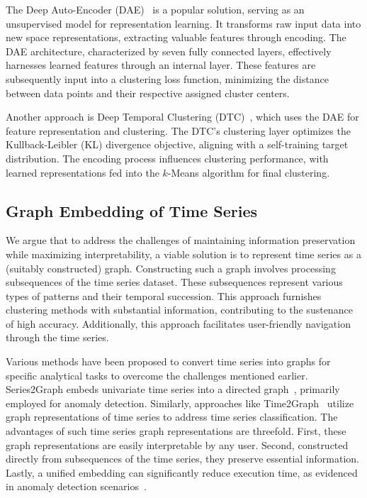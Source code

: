 The Deep Auto-Encoder (DAE)~\cite{tian2014learning} is a popular solution, serving as an unsupervised model for representation learning. It transforms raw input data into new space representations, extracting valuable features through encoding. The DAE architecture, characterized by seven fully connected layers, effectively harnesses learned features through an internal layer. These features are subsequently input into a clustering loss function, minimizing the distance between data points and their respective assigned cluster centers.

Another approach is Deep Temporal Clustering (DTC)~\cite{DTCAlgorithm}, which uses the DAE for feature representation and clustering. The DTC's clustering layer optimizes the Kullback-Leibler (KL) divergence objective, aligning with a self-training target distribution. The encoding process influences clustering performance, with learned representations fed into the $k$-Means algorithm for final clustering.



\subsection{Graph Embedding of Time Series}
\label{sec:graphforts}


We argue that to address the challenges of maintaining information preservation while maximizing interpretability, a viable solution is to represent time series as a (suitably constructed) graph. 
Constructing such a graph involves processing subsequences of the time series dataset. 
These subsequences represent various types of patterns and their temporal succession. This approach furnishes clustering methods with substantial information, contributing to the sustenance of high accuracy. Additionally, this approach facilitates user-friendly navigation through the time series.

Various methods have been proposed to convert time series into graphs for specific analytical tasks to overcome the challenges mentioned earlier. 
Series2Graph embeds univariate time series into a directed graph~\cite{Series2GraphPaper, DistributedS2G}, primarily employed for anomaly detection. Similarly, approaches like Time2Graph~\cite{9477138} utilize graph representations of time series to address time series classification.
The advantages of such time series graph representations are threefold. 
First, these graph representations are easily interpretable by any user. Second, constructed directly from subsequences of the time series, they preserve essential information. Lastly, a unified embedding can significantly reduce execution time, as evidenced in anomaly detection scenarios~\cite{DistributedS2G}.

